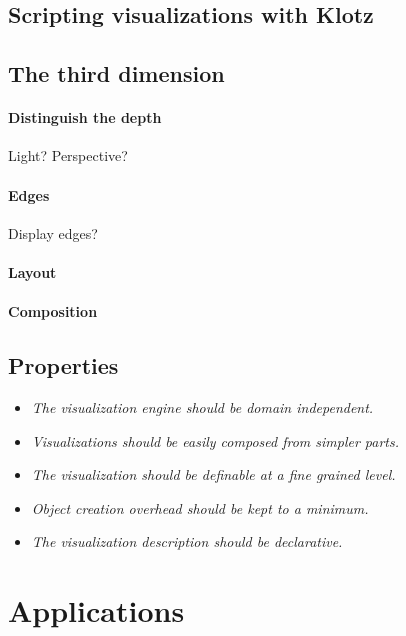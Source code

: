 \documentclass[runningheads]{llncs}
\newcommand{\seclabel}[1]{\label{sec:#1}}
\begin{document}
\subsection{Scripting visualizations with Klotz} \seclabel{scripting}

\subsection{The third dimension} \seclabel{3d}

\paragraph{Distinguish the depth} Light? Perspective? 

\paragraph{Edges} Display edges?

\paragraph{Layout}

\paragraph{Composition}

\subsection{Properties} \seclabel{properties}

\begin{itemize}
\item \emph{The visualization engine should be domain independent.}
\item \emph{Visualizations should be easily composed from simpler parts.}
\item \emph{The visualization should be definable at a fine grained level.}
\item \emph{Object creation overhead should be kept to a minimum.}
\item \emph{The visualization description should be declarative.}
\end{itemize}

\section{Applications} \seclabel{applications}
\end{document}
